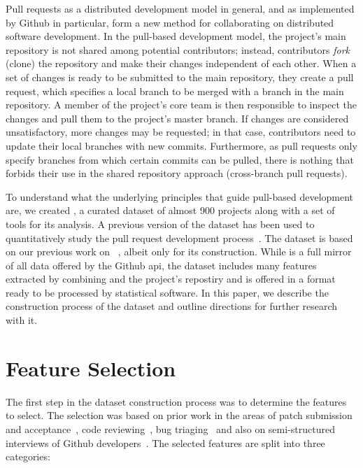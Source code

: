 \documentclass{sig-alternate}
\begin{document}
Pull requests as a distributed development model in general, and as implemented
by Github in particular, form a new method for collaborating on distributed
software development. In the pull-based development model, the project's main
repository is not shared among potential contributors; instead, contributors
\emph{fork} (clone) the repository and make their changes independent of each
other. When a set of changes is ready to be submitted to the main repository,
they create a pull request, which specifies a local branch to be merged with a
branch in the main repository. A member of the project's core team is then
responsible to inspect the changes and pull them to the project's master branch.
If changes are considered unsatisfactory, more changes may be requested; in that
case, contributors need to update their local branches with new commits.
Furthermore, as pull requests only specify branches from which certain commits
can be pulled, there is nothing that forbids their use in the shared 
repository approach (cross-branch pull requests).

To understand what the underlying principles that guide pull-based development
are, we created \pullreqs, a curated dataset of almost 900 projects along with a
set of tools for its analysis. A previous version of the dataset has been used
to quantitatively study the pull request development process~\cite{GPD14}. The
\pullreqs dataset is based on our previous work on \ghtorrent~\cite{Gousi13},
albeit only for its construction. While \ghtorrent is a full mirror of all
data offered by the Github {\sc api}, the \pullreqs dataset includes many features extracted by combining \ghtorrent and the project's repostiry and is offered in a format ready to be processed by statistical software.
In this paper, we describe the construction
process of the dataset and outline directions for further research with it.

\section{Feature Selection}
\label{sec:expdata}

The first step in the dataset construction process was to determine the
features to select.
The selection was based on prior work in the areas of patch submission
and acceptance~\cite{Baysa12}, code reviewing~\cite{Rigby13}, bug triaging~\cite{Giger10} and also on
semi-structured interviews of Github developers~\cite{Dabbi12, Pham13}.
The selected features are split into three categories:
\end{document}
